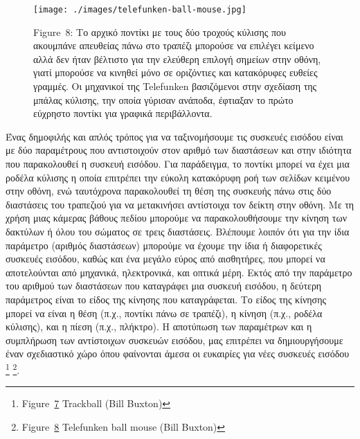 \documentclass[
]{article}
\begin{document}
\leavevmode{}%
\begin{figure}
\hypertarget{fig:telefunken-ball-mouse}{%
\centering
\texttt{[image: ./images/telefunken-ball-mouse.jpg]}
\caption{Figure~8: Το αρχικό ποντίκι με τους δύο τροχούς κύλισης που
ακουμπάνε απευθείας πάνω στο τραπέζι μπορούσε να επιλέγει κείμενο αλλά
δεν ήταν βέλτιστο για την ελεύθερη επιλογή σημείων στην οθόνη, γιατί
μπορούσε να κινηθεί μόνο σε οριζόντιες και κατακόρυφες ευθείες γραμμές.
Οι μηχανικοί της Telefunken βασιζόμενοι στην σχεδίαση της μπάλας
κύλισης, την οποία γύρισαν ανάποδα, έφτιαξαν το πρώτο εύχρηστο ποντίκι
για γραφικά περιβάλλοντα.}\label{fig:telefunken-ball-mouse}
}
\end{figure}

Ένας δημοφιλής και απλός τρόπος για να ταξινομήσουμε τις συσκευές
εισόδου είναι με δύο παραμέτρους που αντιστοιχούν στον αριθμό των
διαστάσεων και στην ιδιότητα που παρακολουθεί η συσκευή εισόδου. Για
παράδειγμα, το ποντίκι μπορεί να έχει μια ροδέλα κύλισης η οποία
επιτρέπει την εύκολη κατακόρυφη ροή των σελίδων κειμένου στην οθόνη, ενώ
ταυτόχρονα παρακολουθεί τη θέση της συσκευής πάνω στις δύο διαστάσεις
του τραπεζιού για να μετακινήσει αντίστοιχα τον δείκτη στην οθόνη. Με τη
χρήση μιας κάμερας βάθους πεδίου μπορούμε να παρακολουθήσουμε την κίνηση
των δακτύλων ή όλου του σώματος σε τρεις διαστάσεις. Βλέπουμε λοιπόν ότι
για την ίδια παράμετρο (αριθμός διαστάσεων) μπορούμε να έχουμε την ίδια
ή διαφορετικές συσκευές εισόδου, καθώς και ένα μεγάλο εύρος από
αισθητήρες, που μπορεί να αποτελούνται από μηχανικά, ηλεκτρονικά, και
οπτικά μέρη. Εκτός από την παράμετρο του αριθμού των διαστάσεων που
καταγράφει μια συσκευή εισόδου, η δεύτερη παράμετρος είναι το είδος της
κίνησης που καταγράφεται. Το είδος της κίνησης μπορεί να είναι η θέση
(π.χ., ποντίκι πάνω σε τραπέζι), η κίνηση (π.χ., ροδέλα κύλισης), και η
πίεση (π.χ., πλήκτρο). Η αποτύπωση των παραμέτρων και η συμπλήρωση των
αντίστοιχων συσκευών εισόδου, μας επιτρέπει να δημιουργήσουμε έναν
σχεδιαστικό χώρο όπου φαίνονται άμεσα οι ευκαιρίες για νέες συσκευές
εισόδου \footnote{Figure~\protect\hyperlink{fig:trackball}{7} Trackball
  (Bill Buxton)} \footnote{Figure~\protect\hyperlink{fig:telefunken-ball-mouse}{8}
  Telefunken ball mouse (Bill Buxton)}.
\end{document}

